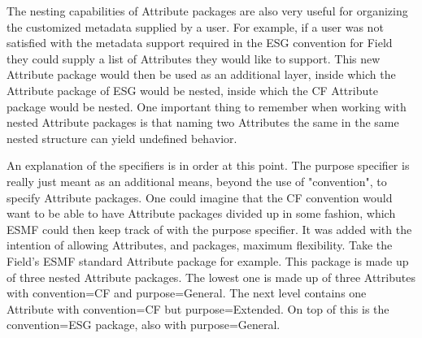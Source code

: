 The nesting capabilities of Attribute packages are also very useful for organizing the customized metadata supplied by a user.  For example, if a user was not satisfied with the metadata support required in the ESG convention for Field they could supply a list of Attributes they would like to support.  This new Attribute package would then be used as an additional layer, inside which the Attribute package of ESG would be nested, inside which the CF Attribute package would be nested.  One important thing to remember when working with nested Attribute packages is that naming two Attributes the same in the same nested structure can yield undefined behavior.

An explanation of the specifiers is in order at this point.  The purpose 
specifier is really just meant as an additional means, beyond the use of 
"convention", to specify Attribute packages.  One could imagine that the 
CF convention would want to be able to have Attribute packages divided 
up in some fashion, which ESMF could then keep track of with the purpose 
specifier.  It was added with the intention of allowing Attributes, and 
packages, maximum flexibility.  Take the Field's ESMF standard Attribute 
package for example.  This 
package is made up of three nested Attribute packages.  The lowest one 
is made up of three Attributes with convention=CF and purpose=General.  
The next level contains one Attribute with convention=CF but 
purpose=Extended.  On top of this is the convention=ESG package, also 
with purpose=General.
